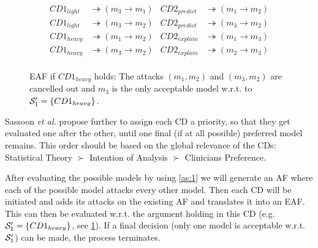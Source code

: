 \begin{table}[hbtp]
	\begin{align*}
		CD1_{light} &\twoheadrightarrow (m_3 \rightarrow m_1) & CD2_{predict} &\twoheadrightarrow (m_1 \rightarrow m_2)\\
		CD1_{light} &\twoheadrightarrow (m_3 \rightarrow m_2) & CD2_{predict} &\twoheadrightarrow (m_3 \rightarrow m_2)\\
		CD1_{heavy} &\twoheadrightarrow (m_1 \rightarrow m_2) & CD2_{explain} &\twoheadrightarrow (m_1 \rightarrow m_3)\\
		CD1_{heavy} &\twoheadrightarrow (m_3 \rightarrow m_2) & CD2_{explain} &\twoheadrightarrow (m_2 \rightarrow m_3)\\
	\end{align*}
	\caption{Orders over models derived from the two different \glspl{CD} (see )}
	\label{tab:orders}
\end{table}

\begin{figure}[hbtp]
	\centering
	
	\caption{\gls{EAF} if $CD1_{heavy}$ holds: The attacks $(m_1,m_2)$ and $(m_3,m_2)$ are cancelled out and $m_3$ is the only acceptable model w.r.t. to $\S_1' = \{CD1_{heavy}\}$.}
	\label{fig:cd1_heavy}
\end{figure}

Sassoon \textit{et al.} propose further to assign each \gls{CD} a priority, so that they get evaluated one after the other, until one final (if at all possible) preferred model remains. This order should be based on the global relevance of the \glspl{CD}: Statistical Theory $\succ$ Intention of Analysis $\succ$ Clinicians Preference. 

After evaluating the possible models by using \autoref{as:1} we will generate an \gls{AF} where each of the possible model attacks every other model. Then each \gls{CD} will be initiated and adds its attacks on the existing \gls{AF} and translates it into an \gls{EAF}. This can then be evaluated w.r.t. the argument holding in this \gls{CD} (e.g. $\S_1' = \{CD1_{heavy}\}$, see \cref{fig:cd1_heavy}). If a final decision (only one model is acceptable w.r.t. $\S_1'$) can be made, the process terminates. 


